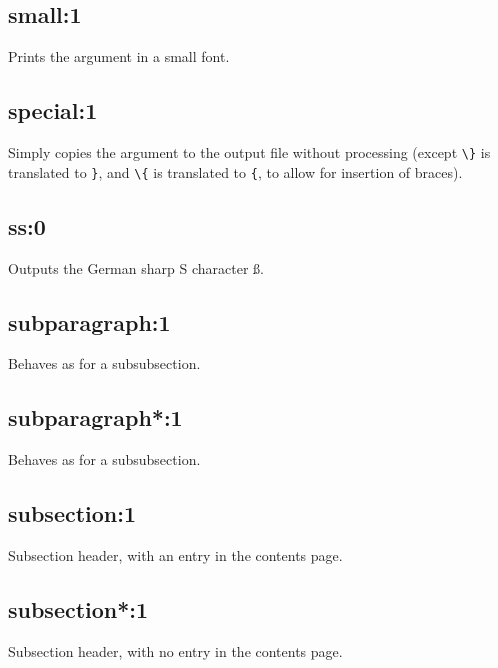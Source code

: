 \subsection*{small:1}\label{small}

Prints the argument in a small font.

\subsection*{special:1}\label{special}

Simply copies the argument to the output file without processing
(except \verb$\}$ is translated to \verb$}$, and \verb$\{$ is
translated to \verb${$, to allow for insertion of braces).

\subsection*{ss:0}\label{ss}

Outputs the German sharp S character \ss.

\subsection*{subparagraph:1}\label{subparagraph}

Behaves as for a subsubsection.

\subsection*{subparagraph*:1}\label{subparagraphX}

Behaves as for a subsubsection.

\subsection*{subsection:1}\label{subsection}

Subsection header, with an entry in the contents page. 

\subsection*{subsection*:1}\label{subsectionX}

Subsection header, with no entry in the contents page. 

